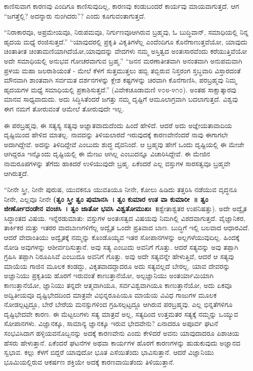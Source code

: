 ಕಾಣಿಸುವಾಗ ಕಾರಣವು ಎಂದಿಗೂ ಕಾಣಿಸುವುದಿಲ್ಲ, ಕಾರಣವು ಕಂಡುಬಂದರೆ ಕಾರ್ಯವು ಮಾಯವಾಗುತ್ತದೆ. ಆಗ “ಜಗತ್ತೆಲ್ಲಿ? ಅದನ್ನಾರು ನುಂಗಿದರು”? ಎಂದು ಕೂಗುವಂತಾಗುತ್ತದೆ.

\newpage

“ನಿರಾಕಾರವೂ, ಅಪ್ರಮೇಯವೂ, ನಿರುಪಮವೂ, ನಿರ್ಗುಣವೂ\break ಆಗಿರುವ ಬ್ರಹ್ಮವು, ಓ ಬುದ್ಧಿವಾನ್​, ಸಮಾಧಿಯಲ್ಲಿ ನಿನ್ನ ಹೃದಯ ಮಧ್ಯೆ ರಂಜಿಸು\-ತ್ತದೆ.” “ಯಾವುದರಲ್ಲಿ ಪ್ರಕೃತಿ ವಿಕೃತಿಗಳೆಲ್ಲ ಎಂದೆಂದಿಗೂ ಕೊನೆಗಾಣುತ್ತವೆಯೋ, ಯಾವುದು ಚಿಂತಾತೀತ ಚಿಂತಾಮಣಿಯಾಗಿದೆಯೋ,\break ಯಾವುದನ್ನು ವೇದಗಳು ನಮ್ಮ ಅಸ್ತಿತ್ವದ ಅಂತಃಸಾರವೆಂದು ಕರೆಯುತ್ತಿವೆಯೋ ಅದೇ ಸಮಾಧಿಯಲ್ಲಿ ಅನುಭವ ಗೋಚರವಾಗುವ ಬ್ರಹ್ಮ.” “ಜನನ ಮರಣಾತೀತವಾಗಿ ಅನಂತವಾಗಿ ಅನುಪಮವಾಗಿ ಪ್ರಳಯ ಮಹಾ ಜಲರಾಶಿಯಂತೆ - ಮೇಲೆ ಕೆಳಗೆ ಸುತ್ತಮುತ್ತಲು ಹಬ್ಬಿ ತಬ್ಬಿರುವ ನಿಸ್ತರಂಗ ಸ್ತಬ್ಧವಾರಿ ವಿಸ್ತಾರದಂತೆ ಮೌನವಾಗಿ ಶಾಂತವಾಗಿ ಸರ್ವಮತ ದರ್ಶನಗಳನ್ನು ಕ್ಲೇಶ ಕಷ್ಟಗಳನ್ನು ಚಿರವಾಗಿ ಕೊನೆಗಾಣಿಸಿ, ಪರಬ್ರಹ್ಮವು ನಿಮ್ಮ ಹೃದಯಗಳ ಮಧ್ಯೆ ಸಮಾಧಿಯಲ್ಲಿ ಪ್ರಕಾಶಿಸುತ್ತದೆ.” (ವಿವೇಕಚೂಡಾಮಣಿ ೪೦೮-೪೧೦). ಅಂತಹ ಸಾಕ್ಷಾತ್ಕಾರವು ಮಾನವ ಸಾಧ್ಯವಾದುದು. ಅದು ಸಿದ್ಧಿಸಿತೆಂದರೆ ಜಗತ್ತು ನಮ್ಮ ದೃಷ್ಟಿಗೆ ಆಮೂಲಾಗ್ರವಾಗಿ ಬದಲಾಗುತ್ತದೆ. ವಿಶ್ವವು ಈಗ ನಮಗೆ ತೋರುವಂತೆ ಆಮೇಲೆ ತೋರುವುದೇ ಇಲ್ಲ.

ಈ ಪರಬ್ರಹ್ಮವು, ಈ ಸತ್ಯಸ್ಯ ಸತ್ಯವು ಅಜ್ಞಾತವಾದುದೆಂದು ಹಿಂದೆ ಹೇಳಿದೆ. ಆದರೆ ಅದು ಅಜ್ಞೇಯತಾವಾದಿಯ ದೃಷ್ಟಿಯಿಂದ ಹೇಳಿದ ಮಾತಲ್ಲ. ನಾವದನ್ನು ತಿಳಿಯಲಾರದೆ ಇರುವುದಕ್ಕೆ ಕಾರಣವೇನೆಂದರೆ ನಾವು ಈಗಾಗಲೇ ಅದಾಗಿದ್ದೇವೆ. ಅದನ್ನು ತಿಳಿದಿದ್ದೇವೆ ಎಂಬುದು ಶುದ್ಧ ದೈವನಿಂದೆ. ಆ ಬ್ರಹ್ಮವು ಹೇಗೆ ಒಂದು ದೃಷ್ಟಿಯಲ್ಲಿ ಈ ಮೇಜೇ ಆಗಿದ್ದರೂ ಇನ್ನೊಂದು ದೃಷ್ಟಿಯಲ್ಲಿ ಈ ಮೇಜು ಆಗಿಲ್ಲ ಎಂಬುದನ್ನೂ ವಿಚಾರಿಸಿದ್ದೇವೆ. ಈ ಮೇಜಿನ ನಾಮರೂಪಗಳನ್ನು ತೆಗೆದು ಹಾಕಿದರೆ ಉಳಿಯುವುದೇ ಬ್ರಹ್ಮ. ಏಕೆಂದರೆ ಎಲ್ಲ ವಸ್ತುಗಳ ಸಾರಸತ್ವವೂ ಬ್ರಹ್ಮವೇ ಆಗಿರುತ್ತದೆ.

“ನೀನೇ ಸ್ತ್ರೀ, ನೀನೇ ಪುರುಷ, ಯುವಕನೂ ಯುವತಿಯೂ ನೀನೇ, ಕೋಲು ಹಿಡಿದು ತತ್ತರಿಸಿ ನಡೆಯುವ ವೃದ್ಧನೂ ನೀನೇ, ಎಲ್ಲವೂ ನೀನೇ \textbf{(ತ್ವಂ ಸ್ತ್ರೀ ತ್ವಂ ಪುಮಾನಸಿ~। ತ್ವಂ ಕುಮಾರ ಉತ ವಾ ಕುಮಾರೀ~॥ ತ್ವಂ ಜೀರ್ಣೋದಂಡೇನ ವಂಚಸಿ~। ತ್ವಂ ಜಾತೋ ಭವಸಿ ವಿಶ್ವತೋಮುಖಃ~॥}\break ಶ್ವೇತಾಶ್ವತರ ಉಪನಿಷತ್ತು). ಅದೇ ಅದ್ವೈತ ಸಿದ್ಧಾಂತದ ವಿಷಯ. ಇನ್ನೆರಡು\break ಮಾತು: ವಸ್ತುಗಳ ಅಂತಃಸತ್ವದ ವಿಷಯವು ನಿಮಗಿಲ್ಲಿ ವಿಶದವಾಗುತ್ತದೆ. ವೈಜ್ಞಾನಿಕರ, ತಾರ್ಕಿಕರ ಮತ್ತು ಇತರರ ವಾದಬಾಣಗಳಿಗೆಲ್ಲ ಅದ್ವೈತ ಒಂದೇ ಪ್ರತಿವಾದ ಬಾಣ. ಬುದ್ಧಿಗೆ ಇಲ್ಲಿ ಬಲವಾದ ಆಧಾರವಿದೆ. ಆದರೆ ವೇದಾಂತಿಯು ಅದ್ವೈತಕ್ಕೆ ನಮ್ಮನ್ನು ಕೊಂಡೊಯ್ಯವ ಇತರ ಸೋಪಾನಗಳನ್ನು ಅಲ್ಲಗಳೆಯುವುದಿಲ್ಲ. ಹಿಂದಕ್ಕೆ ನೋಡಿ ಅವುಗಳನ್ನು ಆಶೀರ್ವದಿಸುತ್ತಾನೆ. ಅವು ಸತ್ಯ ಎಂಬುದು ಅವನಿಗೆ ಗೊತ್ತು. ಆದರೆ ಸತ್ಯವನ್ನು ಅವು ತಪ್ಪಾಗಿ ಗ್ರಹಿಸಿ ತಪ್ಪಾಗಿ ನಿರೂಪಿಸಿವೆ ಎಂಬುದೂ ಅವನಿಗೆ ಗೊತ್ತು. ಅವು ಅದೇ ಸತ್ಯವನ್ನೇ ಹೇಳುತ್ತಿವೆ, ಆದರೆ ಆ ಸತ್ಯವು ಮಾಯೆಯ ಗಾಜಿನ ಮೂಲಕ ಕಂಡದ್ದು, ವಿಕೃತವಾದದ್ದಾದರೂ ಅದು ಸತ್ಯವಲ್ಲದೆ ಬೇರಲ್ಲ. ಯಾವ ದೇವರನ್ನು ಅಜ್ಞಾನಿಯು ಪ್ರಕೃತಿಯ ಹೊರಗೆ ಇರುವಂತೆ ಕಾಣುತ್ತಾನೆಯೋ, ಅಲ್ಪಜ್ಞಾನಿಯು ಅಂತರ್ಯಾಮಿಯಾಗಿ ಕಾಣುತ್ತಾನೆಯೋ, ಜ್ಞಾನಿಯು ತನ್ನದೇ ಆತ್ಮವಾಗಿಯೂ, ಸರ್ವವಿಶ್ವವಾಗಿಯೂ ಕಾಣುತ್ತಾನೆಯೋ, ಅದು ಏಕವೂ ಅದ್ವಿತೀಯವೂ ದೃಷ್ಟಿಭೇದದಿಂದ ಮಾತ್ರವೇ ವಿಭಿನ್ನರೂಪಿಯೂ ಮಾಯೆಯ ವಿವಿಧ ಗಾಜುಗಳ ಮೂಲಕ ನೋಡಲ್ಪಟ್ಟದ್ದೂ, ಬೇರೆ ಬೇರೆಯ ಮನಸ್ಸುಗಳಿಂದ ಗ್ರಹಿಸಲ್ಪಟ್ಟದ್ದೂ ಆಗಿರುವ ಪರಬ್ರಹ್ಮವು. ಎಲ್ಲ ಭಿನ್ನತೆಗಳಿಗೂ ದೃಷ್ಟಿಭೇದವೇ ಕಾರಣ. ಈ ಮೆಟ್ಟಲುಗಳು ಸತ್ಯ ಮಾತ್ರವೆ ಅಲ್ಲ, ಸತ್ಯದಿಂದ ಉತ್ತಮತರ ಸತ್ಯಕ್ಕೆ ನಮ್ಮನ್ನು ಒಯ್ಯುವ ಸೋಪಾನಗಳು. ವಿಜ್ಞಾನಕ್ಕೂ, ಸಾಮಾನ್ಯ ಜ್ಞಾನಕ್ಕೂ ಇರುವ ಭೇದವೇನು? ಏನಾದರೂ ಅಪೂರ್ವ ಘಟನೆ ಸಂಭವಿಸಿದಾಗ ಹಳ್ಳಿ\-ಯವನೊಬ್ಬನನ್ನು ಅದಕ್ಕೆ ಕಾರಣವೇನು ಎಂದು ಕೇಳಿದರೆ ಅವನು ಯಾವು\-ದಾದರೂ ಪಿಶಾಚಿಯ ಹೆಸರು ಹೇಳುತ್ತಾನೆ. ಏಕೆಂದರೆ ಘಟನೆಗಳ ಅಥವಾ ಕಾರ್ಯಗಳ ಹೊರಗೆ ಕಾರಣಗಳನ್ನು ಹುಡುಕುವುದು ಅಜ್ಞಾನದ ಸ್ವಭಾವ. ಕಲ್ಲು ಕೆಳಗೆ ಬಿದ್ದರೆ ಯಾವುದೋ ಭೂತ ಎಸೆಯಿತೆಂದು ಭಾವಿಸುತ್ತಾನೆ. ಆದರೆ ವಿಜ್ಞಾನಿಯು ಭೂಮಿಯಲ್ಲಿರುವ ಆಕರ್ಷಣ ಶಕ್ತಿಯೇ ಅದಕ್ಕೆ ಕಾರಣವಾಯಿತೆಂದು ತಿಳಿಯುತ್ತಾನೆ.

